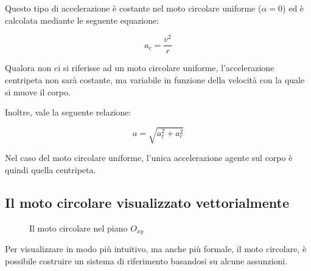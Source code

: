 \documentclass[oneside]{book}
\begin{document}
Questo tipo di accelerazione è costante nel moto circolare uniforme
($\alpha=0$) ed è calcolata mediante le seguente equazione:

\begin{equation}
    a_c=\frac{v^2}{r}
    \label{eq:acc_c}
\end{equation}

Qualora non ci si riferisse ad un moto circolare uniforme,
l'accelerazione centripeta non sarà costante, ma variabile in
funzione della velocità con la quale si muove il corpo.

Inoltre, vale la seguente relazione:

\begin{equation}
    a=\sqrt{a_t^2 + a_c^2}
    \label{eq:acc_moto_cir}
\end{equation}

Nel caso del moto circolare uniforme, l'unica
accelerazione agente sul corpo è quindi quella centripeta.

\subsection{Il moto circolare visualizzato vettorialmente}

\vskip 0.1in

\begin{wrapfigure}{l}{0.45\textwidth}
    \caption{Il moto circolare nel piano $O_{xy}$} \label{fig:moto_circolare}
\end{wrapfigure}

Per visualizzare in modo più intuitivo, ma anche più formale, il
moto circolare, è possibile costruire un sistema di riferimento
basandosi su alcune assunzioni.
\end{document}
